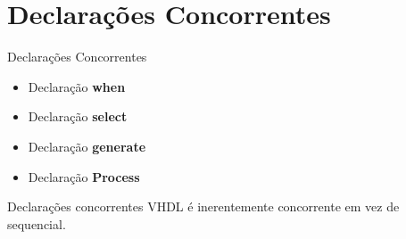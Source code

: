 \documentclass[aspectratio=169]{beamer}
\begin{document}
\section{Declarações Concorrentes}
\begin{frame}{Declarações Concorrentes}
	\justifying
	
	\begin{itemize}
		\item Declaração \textbf{when}
		\item Declaração \textbf{select}
		\item Declaração \textbf{generate}
		\item Declaração \textbf{Process}
	\end{itemize}
	
	
	\begin{block}{Declarações concorrentes}
		VHDL é inerentemente concorrente em vez de sequencial.	
		
	\end{block}
	
	
	
\end{frame}
\end{document}
